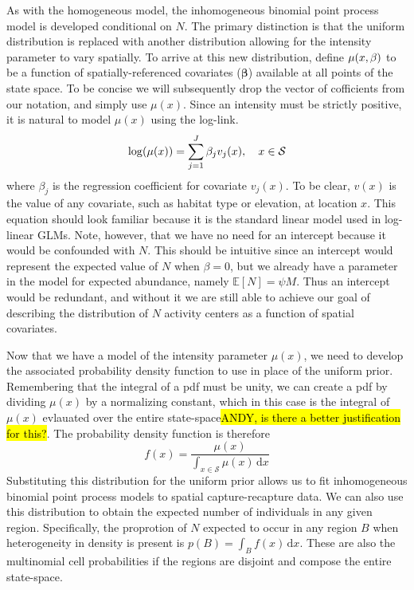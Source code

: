 As with the homogeneous model, the inhomogeneous binomial point process
model is developed conditional on $N$. The primary distinction is that
the uniform distribution is replaced with another distribution
allowing for the intensity parameter to vary spatially. To arrive at
this new distribution, define $\mu(x, {\bf \beta})$ to be a function of
spatially-referenced covariates ($\mathbf{\beta}$) available at all points of the state
space.  To be concise we will subsequently drop the vector of cofficients from our
notation, and simply use $\mu(x)$. Since an intensity must be strictly
positive, it is natural to model $\mu(x)$ using the log-link.
\[
\log(\mu(x)) = \sum_{j=1}^J \beta_j v_j(x), \quad  x \in \cal{S}
\]
where $\beta_j$ is the regression coefficient for covariate
$v_j(x)$. To be clear, $v(x)$ is the value of any covariate, such as
habitat type or elevation, at location $x$.  This equation should look
familiar because it is the standard linear model used in log-linear
GLMs. Note, however, that we have no need
for an intercept because it would be confounded with
$N$. This should be intuitive since an intercept would
represent the expected value of $N$ when $\beta=0$, but we already
have a parameter in the model for expected abundance, namely $\mathbb{E}[N] =
\psi M$. Thus an intercept would be
redundant, and without it we are still able to achieve our goal of
describing the distribution of $N$ activity centers as a function of
spatial covariates.

Now that we have a model of the intensity parameter $\mu(x)$,
we need to develop the associated probability density function to use
in place of the uniform prior. Remembering that
the integral of a pdf must be unity, we can create a pdf by dividing
$\mu(x)$ by a normalizing constant, which in this case is the integral
of $\mu(x)$ evlauated over the entire
state-space\hl{ANDY, is there a better justification for this?}. The
probability density function is therefore
\begin{equation}
f(x) = \frac{\mu(x)}{\int_{x \in \mathcal{S}} \mu(x)\, \mathrm{d}x}
\label{eq:pdf-ipp}
\end{equation}
Substituting this distribution for the
uniform prior allows us to fit inhomogeneous binomial point process
models to spatial capture-recapture data. We can also use this
distribution to obtain the expected number of individuals in any given
region. Specifically, the proprotion of $N$ expected to occur in any
region $B$ when heterogeneity in density is present is $p(B) = \int_B
f(x)\, \mathrm{d}x$. These are
also the multinomial cell probabilities if the regions are
disjoint and compose the entire state-space.

